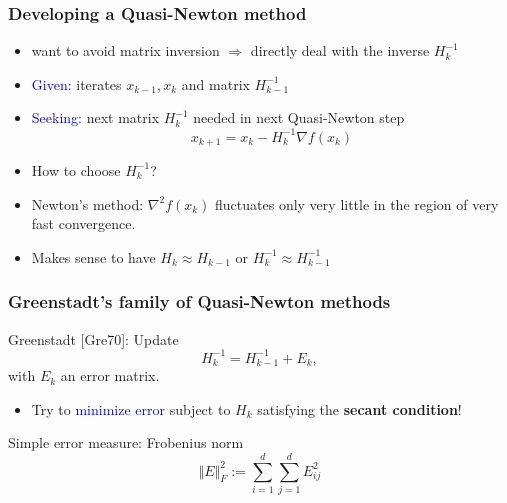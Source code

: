 \documentclass[aspectratio=149]{beamer}
\begin{document}
\begin{frame}
  \frametitle{Developing a Quasi-Newton method}
  \begin{itemize}
    \item want to avoid matrix inversion
          $\Rightarrow$ directly deal with the inverse $H_k^{-1}$
    \item \textcolor{blue}{Given:} iterates $x_{k-1}, x_k$ and matrix $H_{k-1}^{-1}$
    \item \textcolor{blue}{Seeking:} next matrix $H_k^{-1}$ needed in next Quasi-Newton step
          \begin{equation}
            x_{k+1} = x_k - H_k^{-1} \nabla f(x_k)
          \end{equation}
    \item How to choose $H_k^{-1}$?
    \item Newton’s method: $\nabla^2 f(x_k)$ fluctuates only very little in the region of very fast convergence.
    \item Makes sense to have $H_k \approx H_{k-1}$ or $H_k^{-1} \approx H_{k-1}^{-1}$
  \end{itemize}
\end{frame}


\begin{frame}
  \frametitle{Greenstadt's family of Quasi-Newton methods}
  Greenstadt [Gre70]: Update
  \begin{equation}
    H_k^{-1} = H_{k-1}^{-1} + E_k,
  \end{equation}
  with $E_k$ an error matrix.
  \begin{itemize}
    \item Try to \textcolor{blue}{minimize error} subject to $H_k$ satisfying the \textbf{secant condition}!
  \end{itemize}

  Simple error measure: Frobenius norm
  \begin{equation}
    \Vert E \Vert_F^2 := \sum_{i=1}^{d} \sum_{j=1}^{d} E_{ij}^2
  \end{equation}
\end{frame}
\end{document}
